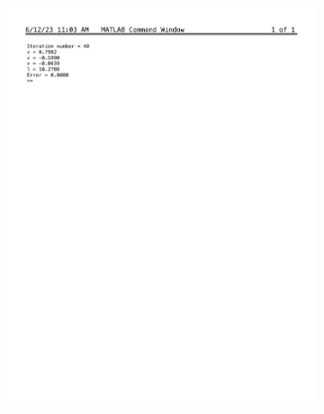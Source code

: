 \documentclass[12pt]{article}
\begin{document}
\begin{enumerate}[label=\bfseries Problem \arabic*:]
\begin{itemize}
\begin{figure}[h!]
\begin{subfigure}{.5\textwidth}
              \includegraphics[width=\linewidth]{Fixed_point_command_window_final.pdf}
            \end{subfigure}
            \end{figure}
    \end{itemize}

\end{enumerate}
\end{document}
